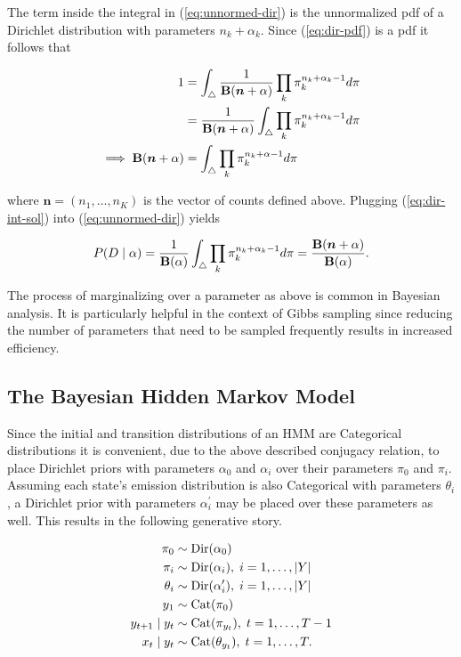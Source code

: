 \documentclass[12pt]{report}
\newcommand{\p}[0]{\prime}
\newcommand{\1}[0]{\mathbbm{1}}
\newcommand{\Cat}[0]{\textnormal{Cat}}
\newcommand{\Dir}[0]{\textnormal{Dir}}
\newcommand{\Bf}[0]{\text{\textbf{B}}}
\DeclarePairedDelimiter\abs{\lvert}{\rvert}%
\begin{document}
The term inside the integral in (\ref{eq:unnormed-dir}) is the unnormalized \ac{pdf}
of a Dirichlet distribution with parameters $n_k + \alpha_k$. Since (\ref{eq:dir-pdf})
is a \ac{pdf} it follows that

\begin{align}
    1
    &= \int_\triangle \frac{1}{\Bf(\bm{n} + \alpha)} \prod_k \pi_k^{n_k + \alpha_k - 1} d \pi \nonumber \\
    &= \frac{1}{\Bf(\bm{n} + \alpha)} \int_\triangle \prod_k \pi_k^{n_k + \alpha_k - 1} d \pi \nonumber  \\
\implies \Bf(\bm{n} + \alpha) &= \int_\triangle \prod_k \pi_k^{n_k + \alpha - 1} d \pi \label{eq:dir-int-sol}
\end{align}

where $\bm{n} = (n_1, \ldots, n_K)$ is the vector of counts defined above.
Plugging (\ref{eq:dir-int-sol}) into (\ref{eq:unnormed-dir}) yields

\begin{equation}
    P(D \mid \alpha)
    = \frac{1}{\Bf(\alpha)}\int_{\triangle} \prod_k \pi_k^{n_k + \alpha_k - 1} d \pi
    = \frac{\Bf(\bm{n} + \alpha)}{\Bf(\alpha)}. \label{eq:dpcmarg}
\end{equation}

The process of marginalizing over a parameter as above is common in Bayesian analysis.
It is particularly helpful in the context of Gibbs sampling since reducing the number
of parameters that need to be sampled frequently results in increased efficiency.

\subsection{The Bayesian Hidden Markov Model}
Since the initial and transition distributions of an \ac{HMM} are Categorical distributions
it is convenient, due to the above described conjugacy relation, to place Dirichlet priors
with parameters $\alpha_0$ and $\alpha_i$ over their parameters $\pi_0$ and $\pi_i$.
Assuming each state's emission distribution is also Categorical
with parameters $\theta_i$, a Dirichlet prior with parameters $\alpha_i^\p$ may be placed
over these parameters as well. This results in the following generative story.

\begin{align*}
    \pi_0 & \sim \Dir(\alpha_0) \\
    \pi_i & \sim \Dir(\alpha_i),\; i = 1, \ldots, \abs{Y} \\
    \theta_i & \sim \Dir(\alpha_i^\p),\; i = 1, \ldots, \abs{Y} \\
    y_1 & \sim \Cat(\pi_0) \\
    y_{t+1} \mid y_t & \sim \Cat(\pi_{y_t}),\; t = 1, \ldots, T-1 \\
    x_t \mid y_t & \sim \Cat(\theta_{y_t}), \; t = 1, \ldots, T.
\end{align*}
\end{document}
